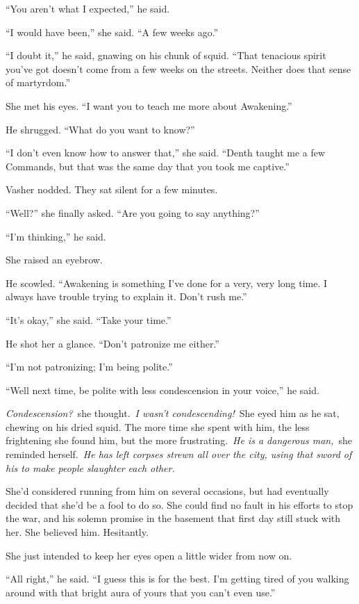 “You aren’t what I expected,” he said.

“I would have been,” she said. “A few weeks ago.”

“I doubt it,” he said, gnawing on his chunk of squid. “That tenacious spirit you’ve got doesn’t come from a few weeks on the streets. Neither does that sense of martyrdom.”

She met his eyes. “I want you to teach me more about Awakening.”

He shrugged. “What do you want to know?”

“I don’t even know how to answer that,” she said. “Denth taught me a few Commands, but that was the same day that you took me captive.”

Vasher nodded. They sat silent for a few minutes.

“Well?” she finally asked. “Are you going to say anything?”

“I’m thinking,” he said.

She raised an eyebrow.

He scowled. “Awakening is something I’ve done for a very, very long time. I always have trouble trying to explain it. Don’t rush me.”

“It’s okay,” she said. “Take your time.”

He shot her a glance. “Don’t patronize me either.”

“I’m not patronizing; I’m being polite.”

“Well next time, be polite with less condescension in your voice,” he said.

\textit{Condescension?}~she thought.~\textit{I wasn’t condescending!}~She eyed him as he sat, chewing on his dried squid. The more time she spent with him, the less frightening she found him, but the more frustrating.~\textit{He is a dangerous man,}~she reminded herself.~\textit{He has left corpses strewn all over the city, using that sword of his to make people slaughter each other.}

She’d considered running from him on several occasions, but had eventually decided that she’d be a fool to do so. She could find no fault in his efforts to stop the war, and his solemn promise in the basement that first day still stuck with her. She believed him. Hesitantly.

She just intended to keep her eyes open a little wider from now on.

“All right,” he said. “I guess this is for the best. I’m getting tired of you walking around with that bright aura of yours that you can’t even use.”

